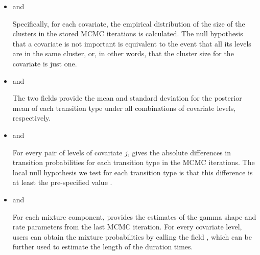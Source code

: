 \begin{itemize}
\item {} and 

Specifically, for each covariate,  the empirical distribution of the size of the clusters in the stored MCMC iterations is calculated. 
The null hypothesis that a covariate is not important is equivalent to the event that all its levels are in the same cluster, or, in other words, that the cluster size for the covariate is just one.

\item {} and 

The two fields provide the mean and standard deviation for the posterior mean of each transition type under all combinations of covariate levels, respectively. 

\item {} and 

For every pair of levels of covariate $j$,   gives the absolute differences in transition probabilities for each transition type in the MCMC iterations.
The local null hypothesis we test for each transition type is that this difference is at least the pre-specified value .

\item {} and 

For each mixture component,   provides the estimates of the gamma shape and rate parameters from the last MCMC iteration.  
{For every covariate level, users can obtain the mixture probabilities by calling the field  ,  which can be further used to estimate the length of the {duration times}.} 
\end{itemize}
 


